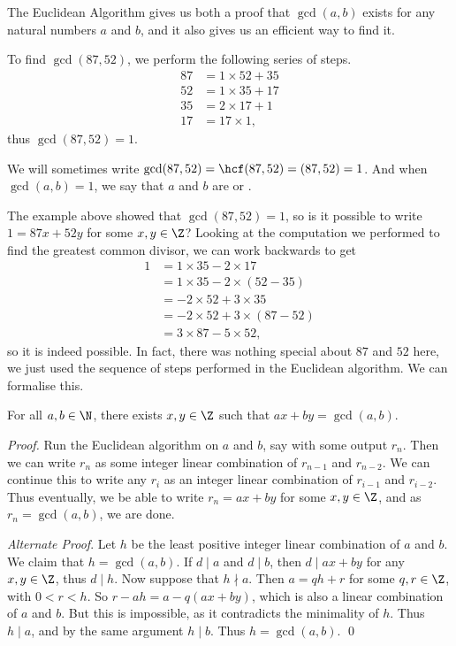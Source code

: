 \documentclass[a4paper]{scrreprt}
\begin{document}
The Euclidean Algorithm gives us both a proof that $\gcd(a, b)$ exists for any natural numbers $a$ and $b$, and it also gives us an efficient way to find it.

\begin{example}
	To find $\gcd(87, 52)$, we perform the following series of steps.
	\begin{align*}
		87 &= 1 \times 52 + 35 \\
		52 &= 1 \times 35 + 17 \\
		35 &= 2 \times 17 + 1\\
		17 &= 17 \times 1,
	\end{align*}
	thus $\gcd(87, 52) = 1$.
\end{example}

\begin{notation}
	We will sometimes write $\gcd(87, 52) = \hcf(87, 52) = (87, 52) = 1$. And when $\gcd(a, b) = 1$, we say that $a$ and $b$ are  or .
\end{notation}

The example above showed that $\gcd(87, 52) = 1$, so is it possible to write $1 = 87x + 52y$ for some $x,y \in \Z$?
Looking at the computation we performed to find the greatest common divisor, we can work backwards to get
\begin{align*}
	1 &= 1 \times 35 - 2 \times 17 \\
	  &= 1 \times 35 - 2 \times (52 - 35) \\
	  &= -2 \times 52 + 3 \times 35 \\
	  &= -2\times 52 + 3 \times (87 - 52) \\
	  &= 3\times 87 - 5 \times 52,
\end{align*}
so it is indeed possible. In fact, there was nothing special about $87$ and $52$ here, we just used the sequence of steps performed in the Euclidean algorithm. We can formalise this.

\begin{theorem}
	For all $a, b \in \N$, there exists $x, y \in \Z$ such that $ax + by = \gcd(a, b)$.
\end{theorem}
\begin{proof} 
	Run the Euclidean algorithm on $a$ and $b$, say with some output $r_n$. Then we can write $r_n$ as some integer linear combination of $r_{n - 1}$ and $r_{n - 2}$.
	We can continue this to write any $r_i$ as an integer linear combination of $r_{i - 1}$ and $r_{i - 2}$. Thus eventually, we be able to write $r_n = ax + by$ for some $x, y \in \Z$, and as $r_n = \gcd(a, b)$, we are done. \hfill \qedhere

	\emph{Alternate Proof}. Let $h$ be the least positive integer linear combination of $a$ and $b$. We claim that $h = \gcd(a, b)$. If $d \mid a$ and $d \mid b$, then $d \mid ax + by$ for any $x, y \in \Z$, thus $d \mid h$. Now suppose that $h \nmid a$. Then $a = qh + r$ for some $q, r \in \Z$, with $0 < r < h$. So $r - ah = a - q(ax + by)$, which is also a linear combination of $a$ and $b$. But this is impossible, as it contradicts the minimality of $h$. Thus $h \mid a$, and by the same argument $h \mid b$. Thus $h = \gcd(a, b)$. \hfill \qed
\end{proof}
\end{document}
